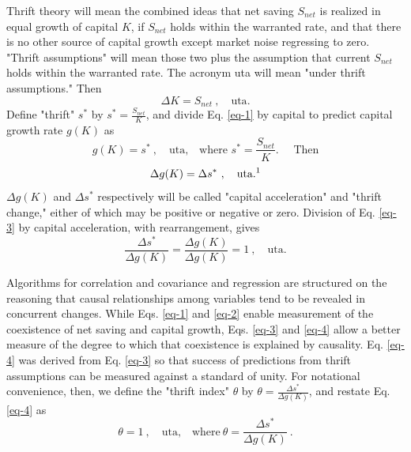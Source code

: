 \documentclass[a4padisinvitingper,fleqn]{latex_styles/cas-sc}
\begin{document}
Thrift theory will mean the combined ideas that net saving \(S_{net}\) is realized in equal growth of capital \(K\), if \(S_{net}\) holds within the warranted rate, and that there is no other source of capital growth except market noise regressing to zero. "Thrift assumptions" will mean those two plus the assumption that current \(S_{net}\) holds within the warranted rate. The acronym uta will mean "under thrift assumptions." Then 
%
\begin{equation}
    \Delta K = S_{net}\ ,\quad \text{uta}. \label{eq-1}
\end{equation}
%
Define "thrift" \(s^*\) by \(s^* = \frac{S_{net}}{K}\), and divide Eq. \eqref{eq-1} by capital to predict capital growth rate \(g(K)\) as
%
\begin{equation}
g(K) = s^* \ , \quad \text{uta,}\quad \text{where } s^* = \frac{S_{net}}{K}.\quad \text{ Then} \label{eq-2}
\end{equation}
%
\vspace{-5ex}
%
\begin{equation}
\Delta g(K) = \Delta s^*\ , \quad \text{uta.\footnotemark} \label{eq-3}
\end{equation}
%
\(\Delta g(K)\) and \(\Delta s^*\) respectively will be called "capital acceleration" and "thrift change," either of which may be positive or negative or zero. Division of Eq. \eqref{eq-3} by capital acceleration, with rearrangement, gives
%
\begin{equation}
\frac{\Delta s^*}{\Delta g(K)} = \frac{\Delta g(K)}{\Delta g(K)} = 1\ , \quad \text{uta}. \label{eq-4}
\end{equation}
%

Algorithms for correlation and covariance and regression are structured on the reasoning that causal relationships among variables tend to be revealed in concurrent changes. While Eqs. \eqref{eq-1} and \eqref{eq-2} enable measurement of the coexistence of net saving and capital growth, Eqs. \eqref{eq-3} and \eqref{eq-4} allow a better measure of the degree to which that coexistence is explained by causality.
%
Eq. \eqref{eq-4} was derived from Eq. \eqref{eq-3} so that success of predictions from thrift assumptions can be measured against a standard of unity. For notational convenience, then, we define the "thrift index" \(\theta\) by \(\theta = \frac{\Delta s^*}{\Delta g(K)}\), and restate Eq. \eqref{eq-4} as
%
\begin{equation}
\theta = 1\ , \quad \text{uta,}\quad \text{where} \ \theta = \frac{\Delta s^*}{\Delta g(K)}\ . \label{eq-5}
\end{equation}
%
\end{document}
